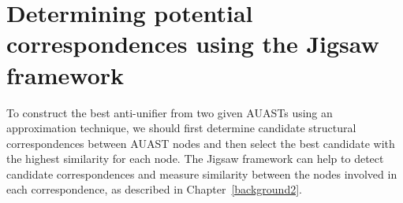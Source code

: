 



\section{Determining potential correspondences using the Jigsaw framework} \label{meth-CAST}
To construct the best anti-unifier from two given AUASTs using an approximation technique, we should first determine candidate structural correspondences between AUAST nodes and then select the best candidate with the highest similarity for each node. The Jigsaw framework can help to detect candidate correspondences and measure similarity between the nodes involved in each correspondence, as described in Chapter~\ref{background2}. 

